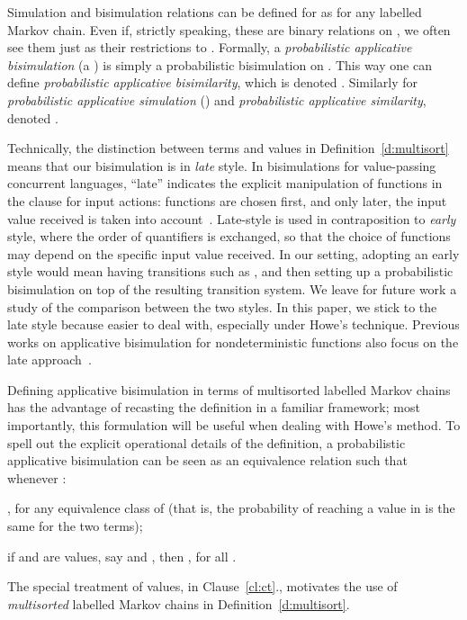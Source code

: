 Simulation and bisimulation relations can be defined for  as for any 
labelled Markov chain. Even if, strictly speaking, these are binary relations on 
, we often see them just as their restrictions to 
. 
Formally, a \emph{probabilistic applicative bisimulation} (a
) is simply a probabilistic bisimulation on . This way one can 
define \emph{probabilistic applicative bisimilarity}, which is denoted .
Similarly for \emph{probabilistic applicative simulation} () and \emph{probabilistic
applicative similarity}, denoted .

\begin{remark}\label{r:el} 
  Technically, the distinction between terms and values in
  Definition~\ref{d:multisort} means that our
  bisimulation is in \emph{late} style. In bisimulations for
  value-passing concurrent languages, ``late'' indicates the explicit
  manipulation of functions in the clause for input actions: functions are
  chosen first, and only later, the input value received is taken into
  account~\cite{SaWabook}. Late-style is used in contraposition to 
  \emph{early} style, where the order of quantifiers is exchanged, so that the
  choice of functions may depend on the specific input value received.
  In our setting, adopting an early style would mean having transitions such as
  , and then setting up a probabilistic
  bisimulation on top of the resulting transition system. 
  We leave for future work a study of the comparison between the two
  styles. In this paper, we stick to the late style because easier to deal with,
  especially under Howe's technique.
  Previous works on applicative
  bisimulation for nondeterministic functions also focus on the late
  approach~\cite{Ong93,PittsSurvey}.
\end{remark} 

\begin{remark}
\label{r:pabfirenze} 
Defining applicative bisimulation in terms of multisorted labelled Markov
chains has the advantage of recasting the definition in a familiar
framework; most importantly, this formulation will be useful when dealing
with Howe's method. To spell out the explicit operational details of the
definition, a probabilistic applicative bisimulation can be seen as an equivalence
relation  such
that whenever :
  \begin{varenumerate}
  \item , for any
    equivalence class  of  
(that
    is, the probability of reaching a value in  is the same for the
    two terms);
  \item
    \label{cl:ct} if  and  are values, say  and , then , for
    all .
  \end{varenumerate}
  The special treatment of values, in Clause~\ref{cl:ct}., motivates the
  use of \emph{multisorted} labelled Markov chains in Definition~\ref{d:multisort}.
\end{remark}

